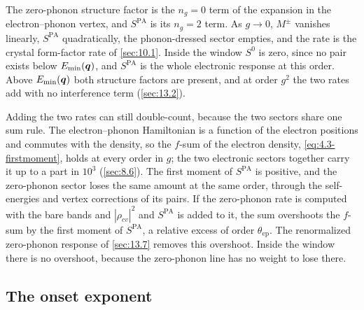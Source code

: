 The zero-phonon structure factor is the $n_g = 0$ term of the expansion in the electron--phonon vertex, and $S^{\mathrm{PA}}$ is its $n_g = 2$ term. As $g \to 0$, $M^\pm$ vanishes linearly, $S^{\mathrm{PA}}$ quadratically, the phonon-dressed sector empties, and the rate is the crystal form-factor rate of \cref{sec:10.1}. Inside the window $S^0$ is zero, since no pair exists below $E_{\mathrm{min}}(\bm{q})$, and $S^{\mathrm{PA}}$ is the whole electronic response at this order. Above $E_{\mathrm{min}}(\bm{q})$ both structure factors are present, and at order $g^2$ the two rates add with no interference term (\cref{sec:13.2}).

Adding the two rates can still double-count, because the two sectors share one sum rule. The electron--phonon Hamiltonian is a function of the electron positions and commutes with the density, so the $f$-sum of the electron density, \cref{eq:4.3-firstmoment}, holds at every order in $g$; the two electronic sectors together carry it up to a part in $10^3$ (\cref{sec:8.6}). The first moment of $S^{\mathrm{PA}}$ is positive, and the zero-phonon sector loses the same amount at the same order, through the self-energies and vertex corrections of its pairs. If the zero-phonon rate is computed with the bare bands and $|\rho_{cv}|^2$ and $S^{\mathrm{PA}}$ is added to it, the sum overshoots the $f$-sum by the first moment of $S^{\mathrm{PA}}$, a relative excess of order $\theta_{\mathrm{ep}}$. The renormalized zero-phonon response of \cref{sec:13.7} removes this overshoot. Inside the window there is no overshoot, because the zero-phonon line has no weight to lose there.

\subsection{The onset exponent}

